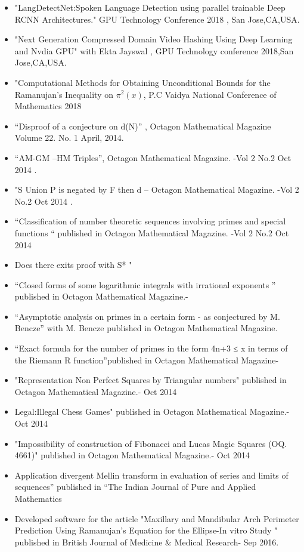\documentclass[]{deedy-resume-openfont}
\begin{document}
\begin{itemize}
\item "LangDetectNet:Spoken Language Detection using parallel trainable Deep RCNN Architectures." GPU Technology Conference 2018 , San Jose,CA,USA.
\item "Next Generation Compressed Domain Video Hashing Using Deep Learning and Nvdia GPU" with Ekta Jayswal , GPU Technology conference 2018,San Jose,CA,USA.
\item "Computational Methods for Obtaining Unconditional Bounds for the Ramanujan’s Inequality on $\pi^2(x)$, P.C Vaidya National Conference of Mathematics 2018

\item “Disproof of a conjecture on d(N)” , Octagon Mathematical  Magazine  Volume 22. No. 1 April, 2014.
\item “AM-GM –HM Triples”, Octagon Mathematical Magazine. -Vol 2 No.2  Oct 2014 .
\item "S Union P is negated by F then d --  Octagon Mathematical Magazine. -Vol 2 No.2  Oct 2014 .
\item  “Classification of number theoretic sequences involving primes and special functions “ published in  Octagon Mathematical Magazine. -Vol 2 No.2  Oct 2014 
\item Does there exits proof with S* "
\item  “Closed forms of some logarithmic integrals with irrational exponents ”  published in Octagon Mathematical Magazine.- 
\item “Asymptotic analysis on primes in a certain form - as conjectured by M. Bencze” with M. Bencze  published in Octagon Mathematical Magazine.
\item “Exact formula for the number of primes in the form 4n+3 ≤ x in terms of the Riemann R function”published in Octagon Mathematical Magazine-
\item "Representation Non Perfect Squares by Triangular numbers" published in Octagon Mathematical Magazine.- Oct 2014
\item Legal:Illegal Chess Games"  published in Octagon Mathematical Magazine.- Oct 2014
\item 
"Impossibility of construction of Fibonacci and Lucas Magic Squares (OQ. 4661)" published in Octagon Mathematical Magazine.- Oct 2014
\item Application divergent Mellin transform in evaluation of series and limits of sequences”  published in “The Indian Journal of Pure and Applied Mathematics
\item Developed software for the article "Maxillary and Mandibular Arch Perimeter Prediction Using Ramanujan's Equation for the Ellipse-In vitro Study " published in  British Journal of Medicine & Medical Research- Sep 2016.
\end{itemize}
\sectionsep
\end{document}
